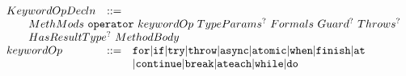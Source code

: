 \newcommand{\usrContinue}[3]{\ensuremath{{#1}\texttt{.continue}\texttt{[}{#2}\texttt{]}^?~{#3}^?\texttt{;}}}
\newcommand{\libContinue}[3]{\ensuremath{{#1}\texttt{.operator continue}\texttt{[}{#2}\texttt{]}^?\texttt{(}{#3}^?\texttt{);}}}

\newcommand{\usrBreak}[3]{\ensuremath{{#1}\texttt{.break}\texttt{[}{#2}\texttt{]}^?~{#3}^?\texttt{;}}}
\newcommand{\libBreak}[3]{\ensuremath{{#1}\texttt{.operator break}\texttt{[}{#2}\texttt{]}^?\texttt{(}{#3}^?\texttt{);}}}

\newcommand{\usrAteach}[5]{\ensuremath{{#1}\texttt{.ateach}\texttt{[}{#2}\texttt{]}^?\texttt{(}({#3}\texttt{~in})^?~{#4}\texttt{)~}{#5}}}
\newcommand{\libAteach}[5]{\ensuremath{{#1}\texttt{.operator~ateach}\texttt{[}{#2}\texttt{]}^?\texttt{(}{#4}\texttt{,}~\texttt{(}{#3}^?\texttt{)}~\texttt{=>}~{#5}\texttt{);}}}

\newcommand{\usrWhile}[4]{\ensuremath{{#1}\texttt{.while}\texttt{[}{#2}\texttt{]}^?\texttt{(}{#3}\texttt{)~}{#4}}}
\newcommand{\libWhile}[4]{\ensuremath{{#1}\texttt{.operator~while}\texttt{[}{#2}\texttt{]}^?\texttt{(}%
    {#3}\texttt{,}~%
    \texttt{()=>}~{#4}\texttt{);}}}

\newcommand{\usrDo}[4]{\ensuremath{{#1}\texttt{.do}\texttt{[}{#2}\texttt{]}^?~{#3}\texttt{~while~(}{#4}\texttt{);}}}
\newcommand{\libDo}[4]{\ensuremath{{#1}\texttt{.operator~do}\texttt{[}{#2}\texttt{]}^?\texttt{(}%
    \texttt{()=>}~{#3}\texttt{,}~%
    {#4}\texttt{);}}}


$$
\begin{array}{lcl}
  KeywordOpDecln & ::= &
  \\
  \multicolumn{3}{l}{\qquad
  MethMods\ \mathtt{operator}\ keywordOp\ TypeParams^?\ Formals\ Guard^?\ Throws^?
  }\\
  \multicolumn{3}{l}{\qquad
  HasResultType^?\ MethodBody
  }\\
  keywordOp & ::= &
      \mathtt{for}
    | \mathtt{if}
    | \mathtt{try}
    | \mathtt{throw}
    | \mathtt{async}
    | \mathtt{atomic}
    | \mathtt{when}
    | \mathtt{finish}
    | \mathtt{at}
  \\ &&
    | \mathtt{continue}
    | \mathtt{break}
    | \mathtt{ateach}
    | \mathtt{while}
    | \mathtt{do}
\end{array}
$$

